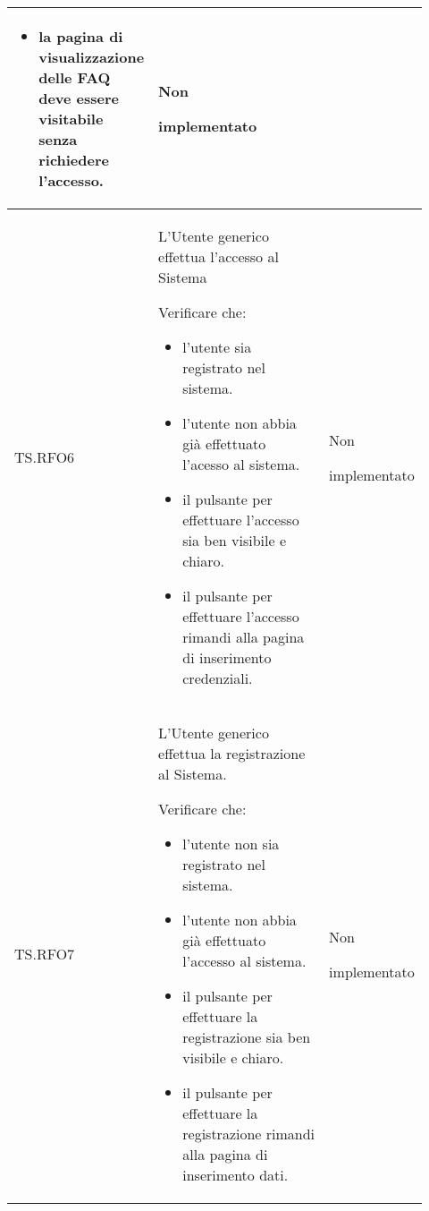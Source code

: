 \begin{longtable}{|p{0.10\linewidth}|p{0.70\linewidth}|p{0.12\linewidth}|}
\begin{itemize}
		\item la pagina di visualizzazione delle FAQ deve essere visitabile senza richiedere l'accesso.
	\end{itemize}                                 &
	Non \par implementato                                                                                                                                                   \\
	\hline
	TS.RFO6                                                                                                                         &
	L'Utente generico effettua l'accesso al Sistema \par
	Verificare che:
	\begin{itemize}
		\item l'utente sia registrato nel sistema.
		\item l'utente non abbia già effettuato l'acesso al sistema.
		\item il pulsante per effettuare l'accesso sia ben visibile e chiaro.
		\item il pulsante per effettuare l'accesso rimandi alla pagina di inserimento credenziali.
	\end{itemize}                                      &
	Non \par implementato                                                                                                                                                   \\
	\hline
	TS.RFO7                                                                                                                         &
	L'Utente generico effettua la registrazione al Sistema. \par
	Verificare che:
	\begin{itemize}
		\item l'utente non sia registrato nel sistema.
		\item l'utente non abbia già effettuato l'accesso al sistema.
		\item il pulsante per effettuare la registrazione sia ben visibile e chiaro.
		\item il pulsante per effettuare la registrazione rimandi alla pagina di inserimento dati.
	\end{itemize}                                      &
	Non \par implementato                                                                                                                                                   \\

\end{longtable}
